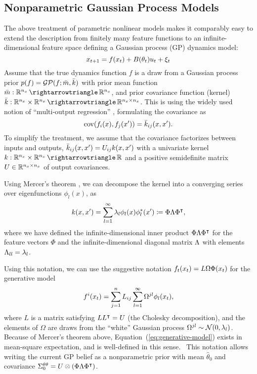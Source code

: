 \subsection{Nonparametric Gaussian Process Models}
\label{sec:nonp-gauss-proc}

The above treatment of parametric nonlinear models makes it comparably easy to
extend the description from finitely many feature functions to an
infinite-dimensional feature space defining a Gaussian process (GP) dynamics
model:
\begin{equation}\label{eq:gp-system}
  x_{\tk+1} = f(x_\tk) + B(\t_\tk) u_\tk + \dist_\tk\\
\end{equation}
Assume that the true dynamics function $f$ is a draw from a Gaussian
process prior $p(f) = \mathcal{GP}(f;\bar m,\bar{k})$ with prior mean function
$\bar m:\Re^\ns \to \Re^\ns$, and prior covariance function (kernel)
$\bar{\k}:\Re^\ns\times \Re^\ns\to \Re^{\ns\times\ns}$. This is using the widely
used notion of ``multi-output regression''
\cite[\textsection~9.1]{Rasmussen.Williams:2006:Gaussian}, \ie
formulating the covariance as
\begin{equation}
  \label{eq:9}
  \cov(f_i(x),f_j(x')) = \bar\k_{ij}(x,x').
\end{equation}
To simplify the treatment, we assume that the covariance factorizes between
inputs and outputs, \ie $\bar{k}_{ij}(x,x') = U_{ij}k(x,x')$ with a
univariate kernel $\k:\Re^\ns\times \Re^\ns \to \Re$ and a positive
semidefinite matrix $U\in\mathbb{R}^{{n_x}\times {n_x}}$ of output covariances.

Using Mercer's theorem \cite[\ts3.a]{Konig:1986:Eigenvalue},
we can decompose the kernel into a converging series over eigenfunctions
$\phi_l(x)$, as
\begin{equation}
  \label{eq:infinite-sum}
  \k(x,x') = \sum_{l=1} ^\infty \lambda_l \phi _l(x) \phi_l ^*
(x') \ce \Phi \L \Phi\T,
\end{equation}
where we have defined the infinite-dimensional inner product $\Phi \Lambda
\Phi^{\intercal}$ for the feature vectors $\Phi$ and the infinite-dimensional diagonal
matrix $\Lambda$ with elements $\Lambda_{ll} = \lambda_l$.

Using this notation, we can use the suggestive notation $f_t(x_t) =
L\Omega\Phi(x_t)$ for the generative model
\begin{equation}
  \label{eq:generative-model}
  f^i(x_\tk) = \sum_{j=1} ^n L_{ij}  \sum_{l=1} ^\infty
\Omega^{jl} \phi_l(x_\tk),
\end{equation}
where $L$ is a matrix satisfying $LL^{\intercal}=U$ (\eg the Cholesky decomposition), and
the elements of $\Omega$ are draws from the ``white'' Gaussian process
$\Omega^{jl} \sim \mathcal{N}(0,\lambda_l)$. Because of Mercer's theorem above,
Equation~(\ref{eq:generative-model}) exists in mean-square expectation, and is
well-defined in this sense.~\iss
{}%
%
This notation allows writing the current GP
belief as a nonparametric prior with mean $\hat{\theta}_0$ and covariance
$\Sigma_0 ^{\theta\theta} = U\otimes (\Phi\Lambda\Phi ^{\intercal})$.

